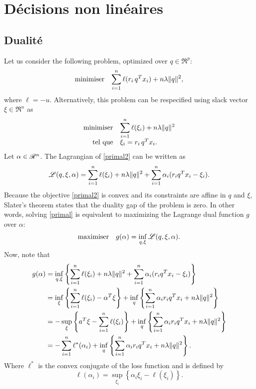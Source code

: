 \section{Décisions non linéaires}

\subsection{Dualité}


Let us consider the following problem, optimized over $q \in \Re^p$:
\begin{equation}
  \label{primal}
  \begin{array}{ll}\operatorname*{minimiser} & \displaystyle{\sum_{i=1}^n\ell(r_i\,q^Tx_i) + n\lambda\|q\|^2,}\end{array}
\end{equation}
where $\ell=-u$. Alternatively, this problem can be respecified using slack vector
$\xi \in \Re^n$ as
\begin{equation}
  \minimizeEquationSt{\label{primal2}\sumi \ell(\xi_i) + n\lambda\|q\|^2}[\xi_i = r_i\,q^Tx_i.] 
\end{equation}
Let $\alpha\in\mathscr{R}^n$. The Lagrangian of \eqref{primal2} can be written as
\begin{equation}
  \mathscr{L}(q,\xi,\alpha) = \sum_{i=1}^n \ell(\xi_i) + n\lambda\|q\|^2 + \sum_{i=1}^n \alpha_i(r_iq^Tx_i - \xi_i).
\end{equation}
Because the objective \eqref{primal2} is convex and its constraints are affine in $q$ and
$\xi$, Slater's theorem states that the duality gap of the problem is zero. In other words,
solving \eqref{primal} is equivalent to maximizing the Lagrange dual function $g$ over
$\alpha$:
\begin{equation}
  \begin{array}{ll}\operatorname*{maximiser} & \displaystyle{g(\alpha) = \inf_{q,\xi} \mathscr{L}(q,\xi,\alpha).}\end{array}
\end{equation}
Now, note that
\begin{align}
  g(\alpha)
  &= \inf_{q,\xi} \left\{\sum_{i=1}^n \ell(\xi_i) + n\lambda\|q\|^2 + \sum_{i=1}^n \alpha_i(r_iq^Tx_i -
    \xi_i)\right\}\\
  &= \inf_\xi\left\{\sum_{i=1}^n \ell(\xi_i) - \alpha^T\xi\right\} + \inf_q\left\{\sum_{i=1}^n \alpha_ir_iq^Tx_i +
    n\lambda\|q\|^2\right\}\\
  & = -\sup_\xi\left\{a^T\xi - \sum_{i=1}^n \ell(\xi_i)\right\} + \inf_q\left\{\sum_{i=1}^n \alpha_ir_iq^Tx_i +
    n\lambda\|q\|^2\right\}\\
  & = -\sum_{i=1}^n \ell^*(\alpha_i) + \inf_q\left\{\sum_{i=1}^n \alpha_ir_iq^Tx_i +n\lambda\|q\|^2\right\}.\label{deriv1} 
\end{align}
Where $\ell^*$ is the convex conjugate of the loss function and is defined by
\begin{equation}
  \ell(\alpha_i) = \sup_{\xi_i}\left\{\alpha_i\xi_i - \ell(\xi_i)\right\}.
\end{equation}
